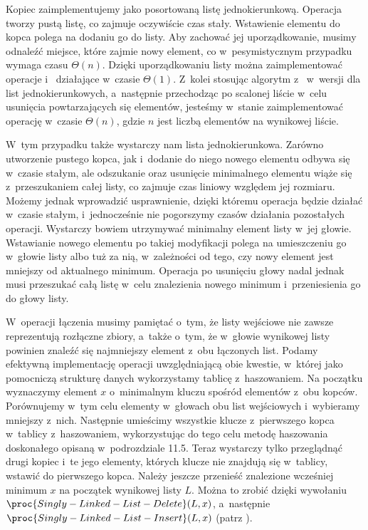 
\subproblem %
Kopiec zaimplementujemy jako posortowaną listę jednokierunkową.
Operacja  tworzy pustą listę, co zajmuje oczywiście czas stały.
Wstawienie elementu do kopca polega na dodaniu go do listy.
Aby zachować jej uporządkowanie, musimy odnaleźć miejsce, które zajmie nowy element, co w~pesymistycznym przypadku wymaga czasu $\Theta(n)$.
Dzięki uporządkowaniu listy można zaimplementować operacje  i~ działające w~czasie $\Theta(1)$.
Z~kolei stosując algorytm z~ w~wersji dla list jednokierunkowych, a~następnie przechodząc po scalonej liście w~celu usunięcia powtarzających się elementów, jesteśmy w~stanie zaimplementować operację  w~czasie $\Theta(n)$, gdzie $n$ jest liczbą elementów na wynikowej liście.

\subproblem %
W~tym przypadku także wystarczy nam lista jednokierunkowa.
Zarówno utworzenie pustego kopca, jak i~dodanie do niego nowego elementu odbywa się w~czasie stałym, ale odszukanie oraz usunięcie minimalnego elementu wiąże się z~przeszukaniem całej listy, co zajmuje czas liniowy względem jej rozmiaru.
Możemy jednak wprowadzić usprawnienie, dzięki któremu operacja  będzie działać w~czasie stałym, i~jednocześnie nie pogorszymy czasów działania pozostałych operacji.
Wystarczy bowiem utrzymywać minimalny element listy w~jej głowie.
Wstawianie nowego elementu po takiej modyfikacji polega na umieszczeniu go w~głowie listy albo tuż za nią, w~zależności od tego, czy nowy element jest mniejszy od aktualnego minimum.
Operacja  po usunięciu głowy nadal jednak musi przeszukać całą listę w~celu znalezienia nowego minimum i~przeniesienia go do głowy listy.

W~operacji łączenia musimy pamiętać o~tym, że listy wejściowe nie zawsze reprezentują rozłączne zbiory, a~także o~tym, że w~głowie wynikowej listy powinien znaleźć się najmniejszy element z~obu łączonych list.
Podamy efektywną implementację operacji  uwzględniającą obie kwestie, w~której jako pomocniczą strukturę danych wykorzystamy tablicę z~haszowaniem.
Na początku wyznaczymy element $x$ o~minimalnym kluczu spośród elementów z~obu kopców.
Porównujemy w~tym celu elementy w~głowach obu list wejściowych i~wybieramy mniejszy z~nich.
Następnie umieścimy wszystkie klucze z~pierwszego kopca w~tablicy z~haszowaniem, wykorzystując do tego celu metodę haszowania doskonałego opisaną w~podrozdziale 11.5.
Teraz wystarczy tylko przeglądnąć drugi kopiec i~te jego elementy, których klucze nie znajdują się w~tablicy, wstawić do pierwszego kopca.
Należy jeszcze przenieść znalezione wcześniej minimum $x$ na początek wynikowej listy $L$.
Można to zrobić dzięki wywołaniu $\proc{Singly-Linked-List-Delete}(L,x)$, a~następnie $\proc{Singly-Linked-List-Insert}(L,x)$ (patrz ).

